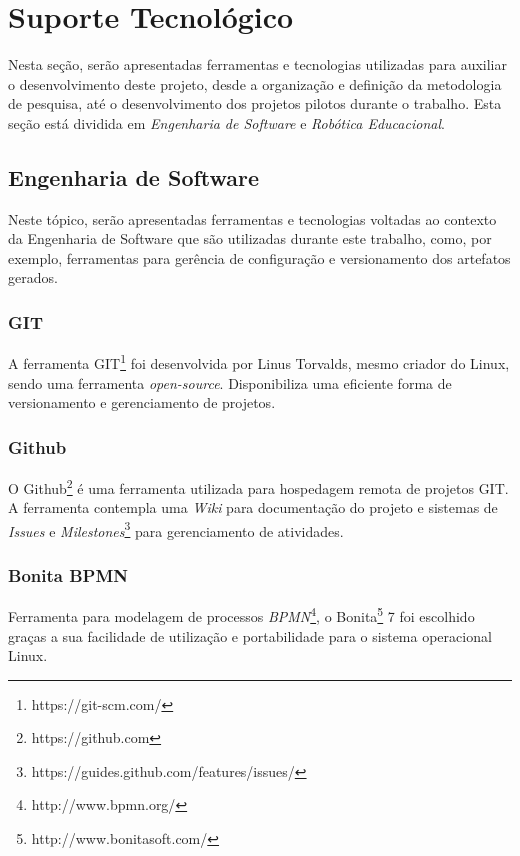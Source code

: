
\chapter[Suporte Tecnológico]{Suporte Tecnológico}

Nesta seção, serão apresentadas ferramentas e tecnologias utilizadas para auxiliar o desenvolvimento deste projeto, desde a organização e definição da metodologia de pesquisa, até o desenvolvimento dos projetos pilotos durante o trabalho. Esta seção está dividida em \textit{Engenharia de Software} e \textit{Robótica Educacional}.

\section{Engenharia de Software} %
\label{sec:engenharia_de_software}
	Neste tópico, serão apresentadas ferramentas e tecnologias voltadas ao contexto da Engenharia de Software que são utilizadas durante este trabalho, como, por exemplo, ferramentas para gerência de configuração e versionamento dos artefatos gerados.

	\subsection{GIT} %
	\label{sub:git}

		A ferramenta GIT\footnote{https://git-scm.com/} foi desenvolvida por Linus Torvalds, mesmo criador do Linux, sendo uma ferramenta \textit{open-source}. Disponibiliza uma eficiente forma de versionamento e gerenciamento de projetos.

	\subsection{Github} %
	\label{sub:github}
		O Github\footnote{https://github.com} é uma ferramenta utilizada para hospedagem remota de projetos GIT. A ferramenta contempla uma \textit{Wiki} para documentação do projeto e sistemas de \textit{Issues} e \textit{Milestones}\footnote{https://guides.github.com/features/issues/} para gerenciamento de atividades.

	\subsection{Bonita BPMN} %
	\label{sub:bonita_bpmn}
		Ferramenta para modelagem de processos \textit{BPMN}\footnote{http://www.bpmn.org/}, o Bonita\footnote{http://www.bonitasoft.com/} 7 foi escolhido graças a sua facilidade de utilização e portabilidade para o sistema operacional Linux.

